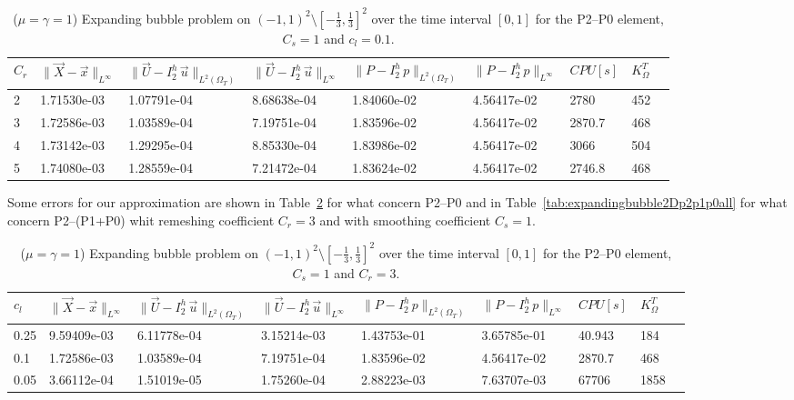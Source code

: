 \documentclass[a4paper,12pt,onecolumn]{article}
\newcommand{\errorXx}{\|\vec{X} - \vec{x}\|_{L^\infty}}
\newcommand{\LerrorUu}[1]{\|\vec U - I^h_{#1}\,\vec u\|_{L^2(\Omega_T)}}
\newcommand{\errorUu}[1]{\|\vec U - I^h_{#1}\,\vec u\|_{L^\infty}}
\newcommand{\errorPp}[1]{\|P - I^h_{#1}\,p\|_{L^\infty}}
\newcommand{\LerrorPp}[1]{\|P - I^h_{#1}\,p\|_{L^2(\Omega_T)}}
\begin{document}
\begin{table}
 \center
 \hspace*{-2cm}
\begin{tabular}{lllllllll}
\hline
$C_r$ & $\errorXx$ & $\LerrorUu2$ & $\errorUu2$ & $\LerrorPp2$ & $\errorPp2$ & $CPU[s]$ & $K_\Omega^T$\\
\hline
2 & 1.71530e-03 & 1.07791e-04 & 8.68638e-04 & 1.84060e-02 & 4.56417e-02 & 2780 & 452\\
3 & 1.72586e-03 & 1.03589e-04 & 7.19751e-04 & 1.83596e-02 & 4.56417e-02 & 2870.7 & 468\\
4 & 1.73142e-03 & 1.29295e-04 & 8.85330e-04 & 1.83986e-02 & 4.56417e-02 & 3066 & 504\\
5 & 1.74080e-03 & 1.28559e-04 & 7.21472e-04 & 1.83624e-02 & 4.56417e-02 & 2746.8 & 468\\
\hline
\end{tabular}
\hspace*{-2cm}
\caption{($\mu=\gamma=1$) Expanding bubble problem on $(-1,1)^2\setminus[-\frac{1}{3},\frac{1}{3}]^2$ over the time interval $[0,1]$ for the P2--P0 element, $C_s=1$ and $c_l=0.1$.}
\label{tab:expandingbubble2Dp2p0bothdiffcr}
\end{table}

Some errors for our approximation are shown in Table~\ref{tab:expandingbubble2Dp2p0all} for what concern P2--P0 and in Table~\ref{tab:expandingbubble2Dp2p1p0all} for what concern P2--(P1+P0) whit remeshing coefficient $C_r=3$ and with smoothing coefficient $C_s=1$.

\begin{table}
 \center
 \hspace*{-2cm}
\begin{tabular}{lllllllll}
\hline
$c_l$ & $\errorXx$ & $\LerrorUu2$ & $\errorUu2$ & $\LerrorPp2$ & $\errorPp2$ & $CPU[s]$ & $K_\Omega^T$\\
\hline
0.25 & 9.59409e-03 & 6.11778e-04 & 3.15214e-03 & 1.43753e-01 & 3.65785e-01 & 40.943 & 184\\
0.1 & 1.72586e-03 & 1.03589e-04 & 7.19751e-04 & 1.83596e-02 & 4.56417e-02 & 2870.7 & 468\\
0.05 & 3.66112e-04 & 1.51019e-05 & 1.75260e-04 & 2.88223e-03 & 7.63707e-03 & 67706 & 1858\\
\hline
\end{tabular}
\hspace*{-2cm}
\caption{($\mu=\gamma=1$) Expanding bubble problem on $(-1,1)^2\setminus[-\frac{1}{3},\frac{1}{3}]^2$ over the time interval $[0,1]$ for the P2--P0 element, $C_s=1$ and $C_r=3$.}
\label{tab:expandingbubble2Dp2p0all}
\end{table}
\end{document}
